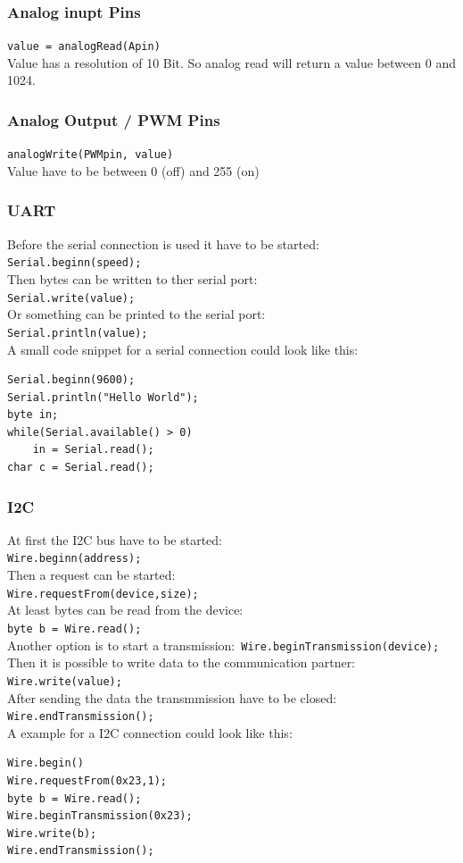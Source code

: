 \documentclass[english, 10pt]{report}
\begin{document}
\subsubsection{Analog inupt Pins}
\lstinline|value = analogRead(Apin)| \\
Value has a resolution of 10 Bit.
So analog read will return a value between 0 and 1024.

\subsubsection{Analog Output / PWM Pins}
\lstinline|analogWrite(PWMpin, value)| \\
Value have to be between 0 (off) and 255 (on)

\subsubsection{UART}
Before the serial connection is used it have to be started: \\
\lstinline|Serial.beginn(speed);| \\
Then bytes can be written to ther serial port: \\
\lstinline|Serial.write(value);| \\
Or something can be printed to the serial port: \\
\lstinline|Serial.println(value);| \\
A small code snippet for a serial connection could look like this:\\
\begin{lstlisting}
Serial.beginn(9600);
Serial.println("Hello World");
byte in;
while(Serial.available() > 0)
	in = Serial.read();
char c = Serial.read();
\end{lstlisting}

\subsubsection{I2C}
At first the I2C bus have to be started: \\
\lstinline|Wire.beginn(address);| \\
Then a request can be started: \\
\lstinline|Wire.requestFrom(device,size);| \\
At least bytes can be read from the device: \\
\lstinline|byte b = Wire.read();| \\
Another option is to start a transmission:\
\lstinline|Wire.beginTransmission(device);| \\
Then it is possible to write data to the communication partner:\\
\lstinline|Wire.write(value);|\\
After sending the data the transmmission have to be closed:\\
\lstinline|Wire.endTransmission();|\\
A example for a I2C connection could look like this:\\
\begin{lstlisting}
Wire.begin()
Wire.requestFrom(0x23,1);
byte b = Wire.read();
Wire.beginTransmission(0x23);
Wire.write(b);
Wire.endTransmission();
\end{lstlisting}
\end{document}
